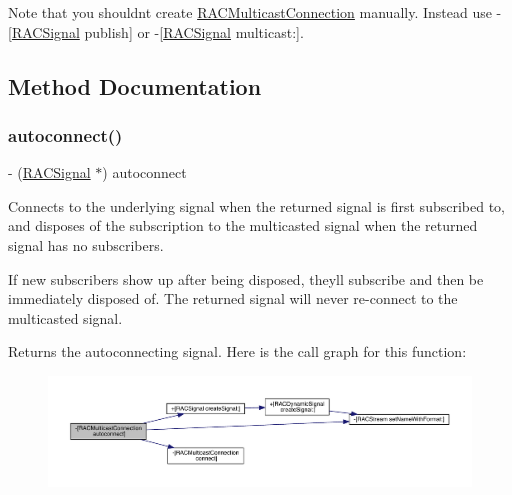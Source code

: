 Note that you shouldn\textquotesingle{}t create \mbox{\hyperlink{interface_r_a_c_multicast_connection}{R\+A\+C\+Multicast\+Connection}} manually. Instead use -\/\mbox{[}\mbox{\hyperlink{interface_r_a_c_signal}{R\+A\+C\+Signal}} publish\mbox{]} or -\/\mbox{[}\mbox{\hyperlink{interface_r_a_c_signal}{R\+A\+C\+Signal}} multicast\+:\mbox{]}. 

\subsection{Method Documentation}
\mbox{\label{interface_r_a_c_multicast_connection_a9a2c385b945f926a9e89a5170bd41dc0}} 
\subsubsection{\texorpdfstring{autoconnect()}{autoconnect()}\hspace{0.1cm}{\footnotesize\ttfamily [1/3]}}
{\footnotesize\ttfamily -\/ (\mbox{\hyperlink{interface_r_a_c_signal}{R\+A\+C\+Signal}} $\ast$) autoconnect \begin{DoxyParamCaption}{ }\end{DoxyParamCaption}}

Connects to the underlying signal when the returned signal is first subscribed to, and disposes of the subscription to the multicasted signal when the returned signal has no subscribers.

If new subscribers show up after being disposed, they\textquotesingle{}ll subscribe and then be immediately disposed of. The returned signal will never re-\/connect to the multicasted signal.

Returns the autoconnecting signal. Here is the call graph for this function\+:\nopagebreak
\begin{figure}[H]
\begin{center}
\leavevmode
\includegraphics[width=350pt]{interface_r_a_c_multicast_connection_a9a2c385b945f926a9e89a5170bd41dc0_cgraph}
\end{center}
\end{figure}
\mbox{\label{interface_r_a_c_multicast_connection_a9a2c385b945f926a9e89a5170bd41dc0}} 
